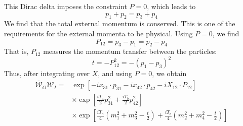 This Dirac delta imposes the constraint $P = 0$, which leads to
\begin{equation}
	p_{1} + p_{2} = p_{3} + p_{4}
\end{equation}
We find that the total external momentum is conserved. This is one of the requirements for the external momenta to be physical. Using $P = 0$, we find
\begin{equation}
	P_{12} = p_{3} - p_{1} = p_{2} - p_{4}
\end{equation}
That is, $P_{12}$ measures the momentum transfer between the particles:
\begin{equation}
	t = {-P^{2}_{12}} = -(p_{1} - p_{3})^{2}
\end{equation}
Thus, after integrating over $X$, and using $P = 0$, we obtain
\begin{equation}
\begin{split}
	\overline{\mathcal{W}}_{O} \mathcal{W}_{I} = {}& \exp{\left[ -i x_{31} \cdot p_{31} -i x_{42} \cdot p_{42} -i X_{12} \cdot P_{12} \right]} \\
	&\times \exp{\left[ \frac{i T_{a}}{2} p_{31}^{2} + \frac{i T_{b}}{2} p_{42}^{2} \right]} \\
	&\times \exp{\left[ \frac{i T_{a}}{4} \left(m_{1}^{2} + m_{3}^{2} - \frac{t}{2} \right) + \frac{i T_{b}}{4} \left(m_{2}^{2} + m_{4}^{2} - \frac{t}{2} \right) \right]}
\end{split} \label{step1}
\end{equation}

